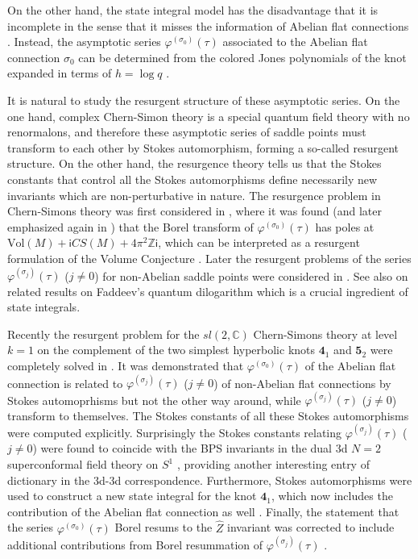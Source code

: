 \documentclass[a4paper,11pt]{article}	%
\def\md{\mathbf}
\def\IC{\mathbb{C}}
\def\IZ{\mathbb{Z}}
\newcommand{\ri}{{\mathsf{i}}}
\newcommand{\s}{\sigma}
\newcommand{\knot}[1]{\md{#1}}
\begin{document}
On the other hand, the state integral model has the disadvantage that
it is incomplete in the sense that it misses the information of
Abelian flat connections \cite{Chung:2014qpa}.  Instead, the
asymptotic series $\varphi^{(\s_0)}(\tau)$ associated to the Abelian
flat connection $\sigma_0$ can be determined from the colored Jones
polynomials of the knot expanded in terms of $h = \log q$
\cite{Bar-Natan,Rozansky:1998urb,Kricker,GK:noncommutative}.


It is natural to study the resurgent structure of these asymptotic
series.  On the one hand, complex Chern-Simon theory is a special
quantum field theory with no renormalons, and therefore these
asymptotic series of saddle points must transform to each other by
Stokes automorphism, forming a so-called resurgent structure.  On the
other hand, the resurgence theory tells us that the Stokes constants
that control all the Stokes automorphisms define necessarily new
invariants which are non-perturbative in nature.  The resurgence
problem in Chern-Simons theory was first considered in
\cite{Garoufalidis:2007wa}, where it was found (and later emphasized
again in \cite{Garoufalidis:2021osl}) that the Borel transform of
$\varphi^{(\s_0)}(\tau)$ has poles at
$\text{Vol}(M)+\ri CS(M) +4\pi^2\IZ\ri$, which can be interpreted as a
resurgent formulation of the Volume Conjecture
\cite{Kashaev:1996kc,Murakami:2001cjp}.  Later the resurgent problems
of the series $\varphi^{(\s_j)}(\tau)$ ($j\neq 0$) for non-Abelian
saddle points were considered in
\cite{Gukov2016,Gang:2017hbs,Garoufalidis:2021lcp}.  See also
\cite{Garoufalidis:2020pax} on related results on Faddeev's quantum
dilogarithm which is a crucial ingredient of state integrals.

Recently the resurgent problem for the $sl(2,\IC)$ Chern-Simons theory
at level $k=1$ on the complement of the two simplest hyperbolic knots
$\knot{4}_1$ and $\knot{5}_2$ were completely solved in
\cite{Garoufalidis:2021osl,Garoufalidis:2020xec,Garoufalidis:2020nut}.
It was demonstrated that $\varphi^{(\s_0)}(\tau)$ of the Abelian flat
connection is related to $\varphi^{(\s_j)}(\tau)$ ($j\neq 0$) of
non-Abelian flat connections by Stokes automoprhisms but not the other
way around, while $\varphi^{(\s_j)}(\tau)$ ($j\neq 0$) transform to
themselves.  The Stokes constants of all these Stokes automorphisms
were computed explicitly.  Surprisingly the Stokes constants relating
$\varphi^{(\s_j)}(\tau)$ ($j\neq 0$) were found to coincide with the
BPS invariants in the dual 3d $N=2$ superconformal field theory on
$S^1$ \cite{Garoufalidis:2020xec,Garoufalidis:2020nut}, providing
another interesting entry of dictionary in the 3d-3d correspondence.
Furthermore, Stokes automorphisms were used to construct a new state
integral for the knot $\knot{4}_1$, which now includes the
contribution of the Abelian flat connection as well
\cite{Garoufalidis:2021osl}.  Finally, the statement that the series
$\varphi^{(\s_0)}(\tau)$ Borel resums to the $\widehat{Z}$ invariant
\cite{Gukov:2019mnk} was corrected to include additional contributions
from Borel resummation of $\varphi^{(\s_j)}(\tau)$
\cite{Garoufalidis:2021osl}.
\end{document}
